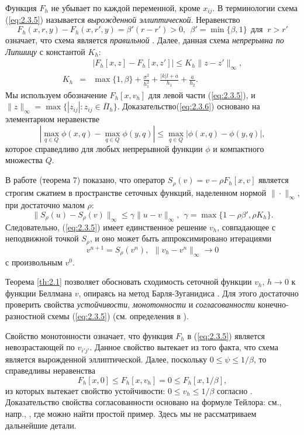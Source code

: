 Функция $F_h$ не убывает по каждой переменной, кроме $x_{ij}$. В терминологии \cite{Obe06} схема (\ref{eq:2.3.5}) называется \emph{вырожденной эллиптической}. Неравенство
$$F_h(x,r,y)-F_h(x,r',y)=\beta' (r-r')>0, \ \ \beta'=\min\{\beta,1\}\ \ \textrm{для }\ r>r'$$
означает, что схема является \emph{правильной} \cite{Obe06}. Далее, данная схема \emph{непрерывна по Липшицу} с константой $K_h$:
\begin{eqnarray}
& & | F_h[x,z]-F_h[x,z']| \le K_h \|z-z'\|_{\infty},\label{eq:2.3.6}\\
K_h &=& \max\{1,\beta\}+\frac{\sigma^2}{h_1^2}+\frac{|k|l+\overline a}{h_1}+\frac{\overline a}{h_2}.\nonumber
\end{eqnarray}
Мы используем обозначение $F_h[x,v_h]$ для левой части (\ref{eq:2.3.5}), и $\|z\|_\infty=\max\{|z_{ij}|:z_{ij}\in \overline \Pi_h\}$. Доказательство(\ref{eq:2.3.6}) основано на элементарном неравенстве
$$ |\max_{q\in Q}\phi(x,q)-\max_{q\in Q}\phi(y,q)|\le\max_{q\in Q} |\phi(x,q)-\phi(y,q)|, $$
которое справедливо для любых непрерывной функции $\phi$ и компактного множества $Q$.

В работе \cite{Obe06} (теорема 7) показано, что оператор $S_\rho(v)=v-\rho F_h[x,v]$ является строгим сжатием в пространстве сеточных функций, наделенном нормой $\|\cdot\|_\infty$, при достаточно малом $\rho$:
$$ \| S_\rho(u)-S_\rho(v)\|_\infty\le\gamma\|u-v\|_\infty,\ \ \gamma=\max\{1-\rho\beta',\rho K_h\}.$$
Следовательно, (\ref{eq:2.3.5}) имеет единственное решение $v_h$, совпадающее с неподвижной точкой $S_\rho$, и оно может быть аппроксимировано итерациями
\begin{equation} \label{eq:2.3.7}
v^{n+1}=S_\rho(v^n),\ \ \|v_h-v^n\|_\infty\to 0
\end{equation}
с произвольным $v^0$.

Теорема \ref{th:2.1} позволяет обосновать сходимость сеточной функции $v_h$, $h\to 0$ к функции Беллмана $v$, опираясь на метод Барля-Зуганидиса \cite[теорема 2.1]{BarSou91}. Для этого достаточно проверить свойства \emph{устойчивости}, \emph{монотонности} и \emph{согласованности} конечно-разностной схемы (\ref{eq:2.3.5}) (см. определения в \cite{BarSou91}).

Свойство монотонности означает, что функция $F_h$ в (\ref{eq:2.3.5}) является невозрастающей по $v_{i'j'}$. Данное свойство вытекает из того факта, что схема является вырожденной эллиптической. Далее, поскольку $0\le\psi\le 1/\beta$, то справедливы неравенства
$$ F_h[x,0]\le F_h[x,v_h]=0\le F_h[x,1/\beta],$$
из которых вытекает свойство устойчивости: $0\le v_h\le 1/\beta$ согласно \cite[теорема 5]{Obe06}. Доказательство свойства согласованности основано на формуле Тейлора: см., напр., \cite{Tour13}, где можно найти простой пример. Здесь мы не рассматриваем дальнейшие детали.

